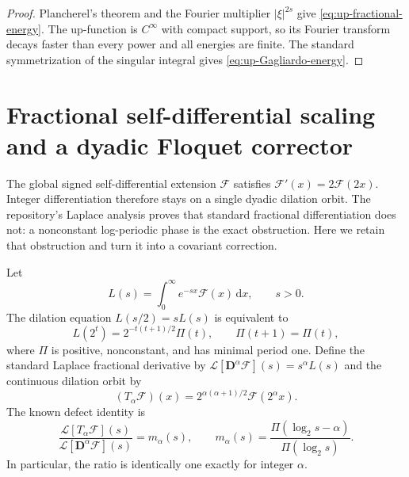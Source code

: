 \documentclass[11pt,oneside]{article}
\theoremstyle{definition}
\newcommand{\dd}{\,\mathrm d}
\begin{document}
\begin{proof}
Plancherel's theorem and the Fourier multiplier \(|\xi|^{2s}\) give
\eqref{eq:up-fractional-energy}.  The up-function is \(C^\infty\) with compact support,
so its Fourier transform decays faster than every power and all energies are finite.
The standard symmetrization of the singular integral gives
\eqref{eq:up-Gagliardo-energy}.
\end{proof}

\section{Fractional self-differential scaling and a dyadic Floquet corrector}
\label{sec:Floquet-fractional}

The global signed self-differential extension \(\mathcal F\) satisfies
\(\mathcal F'(x)=2\mathcal F(2x)\).  Integer differentiation therefore stays on a
single dyadic dilation orbit.  The repository's Laplace analysis proves that standard
fractional differentiation does not: a nonconstant log-periodic phase is the exact
obstruction.  Here we retain that obstruction and turn it into a covariant correction.

Let
\begin{equation}\label{eq:global-L-new}
 L(s)=\int_0^\infty e^{-sx}\mathcal F(x)\dd x,
 \qquad s>0.
\end{equation}
The dilation equation \(L(s/2)=sL(s)\) is equivalent to
\begin{equation}\label{eq:global-L-Floquet}
 L(2^t)=2^{-t(t+1)/2}\Pi(t),
 \qquad \Pi(t+1)=\Pi(t),
\end{equation}
where \(\Pi\) is positive, nonconstant, and has minimal period one.  Define the
standard Laplace fractional derivative by
\(
 \mathcal L[\mathbf D^\alpha\mathcal F](s)=s^\alpha L(s)
\)
and the continuous dilation orbit by
\begin{equation}\label{eq:Talpha-new}
 (T_\alpha\mathcal F)(x)
 =2^{\alpha(\alpha+1)/2}\mathcal F(2^\alpha x).
\end{equation}
The known defect identity is
\begin{equation}\label{eq:known-fractional-defect-new}
 \frac{\mathcal L[T_\alpha\mathcal F](s)}
      {\mathcal L[\mathbf D^\alpha\mathcal F](s)}
 =m_\alpha(s),
 \qquad
 m_\alpha(s)=\frac{\Pi(\log_2s-\alpha)}{\Pi(\log_2s)}.
\end{equation}
In particular, the ratio is identically one exactly for integer \(\alpha\).
\end{document}
